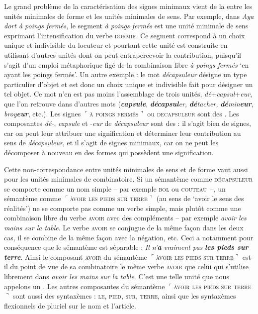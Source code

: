 Le grand problème de la caractérisation des signes minimaux vient de la  entre les unités minimales de forme et les unités minimales de sens. Par exemple, dans \textit{Aya dort à poings fermés}, le segment \textit{à poings fermés} est une unité minimale de sens exprimant l’intensification du verbe \textsc{dormir}. Ce segment correspond à un choix unique et indivisible du locuteur et pourtant cette unité est construite en utilisant d’autres unités dont on peut entrapercevoir la contribution, puisqu’il s’agit d’un emploi métaphorique figé de la combinaison libre \textit{à poings fermés} ‘en ayant les poings fermés’. Un autre exemple : le mot \textit{décapsuleur} désigne un type particulier d’objet et est donc un choix unique et indivisible fait pour désigner un tel objet. Ce mot n’en est pas moins l’assemblage de trois unités, \textit{dé}+\textit{capsul}+\textit{eur}, que l’on retrouve dans d’autres mots (\textbf{\textit{capsule}}, \textbf{\textit{décapsul}}\textit{er,} \textbf{\textit{dé}}\textit{tacher,} \textbf{\textit{dé}}\textit{min}\textbf{\textit{eur}}, \textit{broy}\textit{\textbf{eur}}, etc.). Les signes $⌜$\textsc{à} \textsc{poings} \textsc{fermés}$⌝$ ou \textsc{decapsuleur} sont des . Les composantes \textit{dé-}, \textit{capsule} et -\textit{eur} de \textit{décapsuleur} sont des  : il s’agit bien de signes, car on peut leur attribuer une signification et déterminer leur contribution au sens de \textit{décapsuleur}, et il s’agit de signes minimaux, car on ne peut les décomposer à nouveau en des formes qui possèdent une signification.

Cette non-correspondance entre unités minimales de sens et de forme vaut aussi pour les unités minimales de combinatoire. Si un sémantème comme \textsc{décapsuleur} se comporte comme un nom simple – par exemple \textsc{bol} ou \textsc{couteau}~–, un sémantème comme $⌜$\textsc{àvoir} \textsc{les} \textsc{pieds} \textsc{sur} \textsc{terre}$⌝$ (au sens de ‘avoir le sens des réalités’) ne se comporte pas comme un verbe simple, mais plutôt comme une combinaison libre du verbe \textsc{avoir} avec des compléments – par exemple \textit{avoir les mains sur la table}. Le verbe \textsc{avoir} se conjugue de la même façon dans les deux cas, il se combine de la même façon avec la négation, etc. Ceci a notamment pour conséquence que le sémantème est séparable : \textit{Il n’}\textbf{\textit{a}} \textit{vraiment pas} \textbf{\textit{les pieds sur terre}}. Ainsi le composant \textsc{avoir} du sémantème $⌜$\textsc{àvoir} \textsc{les} \textsc{pieds} \textsc{sur} \textsc{terre}$⌝$ est-il du point de vue de sa combinatoire le même verbe \textsc{avoir} que celui qui s’utilise librement dans \textit{avoir les mains sur la table}. C’est une telle unité que nous appelons un . Les autres composantes du sémantème $⌜$\textsc{àvoir} \textsc{les} \textsc{pieds} \textsc{sur} \textsc{terre}$⌝$ sont aussi des syntaxèmes : \textsc{le,} \textsc{pied,} \textsc{sur,} \textsc{terre}, ainsi que les syntaxèmes flexionnels de pluriel sur le nom et l'article.

